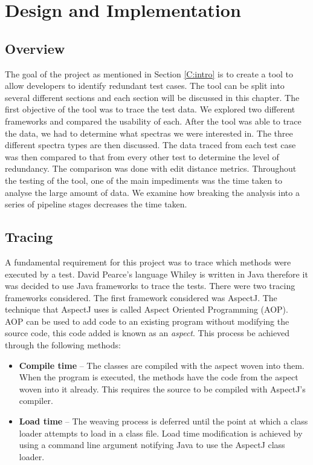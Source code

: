 \chapter{Design and Implementation}\label{C:workdone}

\section{Overview}

The goal of the project as mentioned in Section \ref{C:intro} is to create a tool to allow developers to identify redundant test cases. The tool can be split into several different sections and each section will be discussed in this chapter. The first objective of the tool was to trace the test data. We explored two different frameworks and compared the usability of each. After the tool was able to trace the data, we had to determine what spectras we were interested in. The three different spectra types are then discussed. The data traced from each test case was then compared to that from every other test to determine the level of redundancy. The comparison was done with edit distance metrics. Throughout the testing of the tool, one of the main impediments was the time taken to analyse the large amount of data. We examine how breaking the analysis into a series of pipeline stages decreases the time taken.

\section{Tracing}
\label{S:trace}
A fundamental requirement for this project was to trace which methods were executed by a test. David Pearce's language Whiley is written in Java therefore it was decided to use Java frameworks to trace the tests. There were two tracing frameworks considered. The first framework considered was AspectJ. The technique that AspectJ uses is called Aspect Oriented Programming (AOP). AOP can be used to add code to an existing program without modifying the source code, this code added is known as an \textit{aspect}. This process be achieved through the following methods:

\begin{itemize}
\item \textbf{Compile time} --
The classes are compiled with the aspect woven into them. When the program is executed, the methods have the code from the aspect woven into it already. This requires the source to be compiled with AspectJ's compiler.
\item \textbf{Load time} --
The weaving process is deferred until the point at which a class loader attempts to load in a class file. Load time modification is achieved by using a command line argument notifying Java to use the AspectJ class loader.
\end{itemize}

